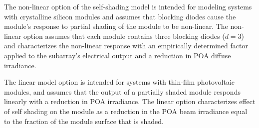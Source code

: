 \documentclass[12pt,letterpaper]{article}
\begin{document}
The non-linear option of the self-shading model is intended for modeling systems with  crystalline silicon modules and assumes that blocking diodes cause the module's response to partial shading of the module to be non-linear. The non-linear option assumes that each module contains three blocking diodes ($d=3$) and characterizes the non-linear response with an empirically determined factor applied to the subarray's electrical output and a reduction in POA diffuse irradiance.

The linear model option is intended for systems with thin-film photovoltaic modules, and assumes that the output of a partially shaded module responds linearly with a reduction in POA irradiance. The linear option characterizes effect of self shading on the module as a reduction in the POA beam irradiance equal to the fraction of the module surface that is shaded.
\end{document}
